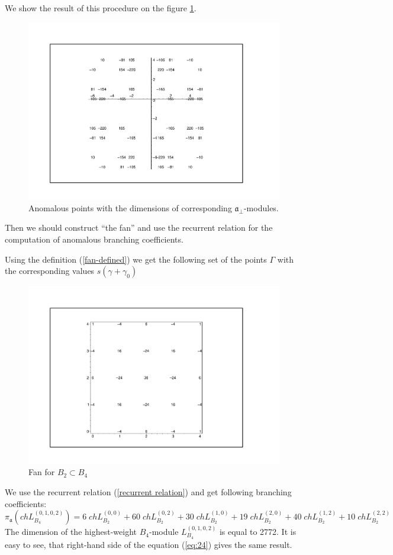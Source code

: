 \documentclass[a4paper,12pt]{article}
\theoremstyle{definition} \newtheorem{Def}{Definition}
\begin{document}
We show the result of this procedure on the figure \ref{fig:B4B2anom}.
\begin{figure}[h]
    \includegraphics[width=170mm]{B4_B2_anom_points.pdf}
  \caption{Anomalous points with the dimensions of corresponding $\mathfrak{a}_{\bot}$-modules.}
  \label{fig:B4B2anom}
\end{figure}

Then we should construct ``the fan'' and use the recurrent relation for the computation of anomalous branching coefficients.

Using the definition (\ref{fan-defined}) we get the following set of
the points $\Gamma$ with the corresponding values $s(\gamma+\gamma_0)$
\begin{figure}[h]
  \includegraphics[width=150mm]{B4_B2_fan.pdf}
  \caption{Fan for $B_2\subset B_4$}
  \label{fig:B4B2Fan}
\end{figure}
We use the recurrent relation (\ref{recurrent relation}) and get
following branching coefficients:
\begin{equation}
  \label{eq:24}
  \pi_{\mathfrak{a}} \left(ch L^{(0,1,0,2)}_{B_4}\right) = 6 \; ch L^{(0,0)}_{B_2}+ 60
  \; ch L_{B_2}^{(0,2)}+ 30 \; ch L_{B_2}^{(1,0)}+ 19 \; ch L_{B_2}^{(2,0)}+
  40 \; ch L_{B_2}^{(1,2)}+ 10 \; ch L_{B_2}^{(2,2)}
\end{equation}
The dimension of the highest-weight $B_4$-module $L^{(0,1,0,2)}_{B_4}$
is equal to 2772. It is easy to see, that right-hand side of the
equation (\ref{eq:24}) gives the same result.
\end{document}
